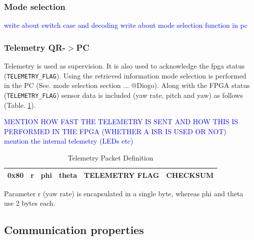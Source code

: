 \documentclass{article}
\newcommand\todo[1]{\textcolor{blue}{#1}} %
\begin{document}

\subsubsection{Mode selection}
\todo{write about switch case and decoding}
\todo{write about mode selection function in pc}


\subsubsection{Telemetry QR-$>$PC}

Telemetry is used as supervision. It is also used to acknowledge the fpga status (\texttt{TELEMETRY\_FLAG}). Using the retrieved information mode selection is performed in the PC (See. mode selection section ... @Diogo). Along with the FPGA status (\texttt{TELEMETRY\_FLAG}) sensor data is included (yaw rate, pitch and yaw) as follows (Table. \ref{tbl:TelPkgDefinition}). 

\todo{ MENTION HOW FAST THE TELEMETRY IS SENT AND HOW THIS IS PERFORMED IN THE FPGA (WHETHER A ISR IS USED OR NOT)}\\

\todo{mention the internal telemetry (LEDs etc)}

\begin{table}[ht]
\centering
\caption{Telemetry Packet Definition}
\begin{tabular}{|c|c|c|c|c|c|}
\hline 
0x80 & r & phi & theta & TELEMETRY FLAG & CHECKSUM \\
\hline 
\end{tabular} 
\label{tbl:TelPkgDefinition}
\end{table}

Parameter r (yaw rate) is encapsulated in a single byte, whereas phi and theta use 2 bytes each.

% 

\subsection{Communication properties}
\end{document}
